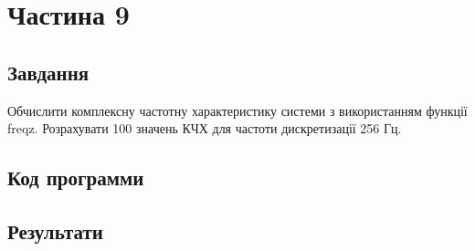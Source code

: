 \section{Частина 9}
\label{sec:task9}

\subsection{Завдання}
\label{subsec:task9_task}

Обчислити комплексну частотну характеристику системи з
використанням функції freqz. Розрахувати 100 значень КЧХ для частоти
дискретизації 256 Гц.

\subsection{Код программи}
\label{subsec:task9_code}

\subsection{Результати}
\label{subsec:task9_results}
